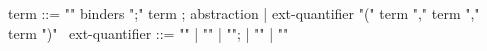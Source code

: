 \begin{syntax}
term ::= "\lambda" binders ";" term ; abstraction
| ext-quantifier "(" term "," term "," term ")"
\
ext-quantifier ::= "\max" | "\min" | "\sum";
                      | "\product" | "\numof"
\end{syntax}